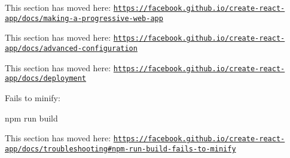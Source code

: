 This section has moved here\+: \href{https://facebook.github.io/create-react-app/docs/making-a-progressive-web-app}{\tt https\+://facebook.\+github.\+io/create-\/react-\/app/docs/making-\/a-\/progressive-\/web-\/app}

This section has moved here\+: \href{https://facebook.github.io/create-react-app/docs/advanced-configuration}{\tt https\+://facebook.\+github.\+io/create-\/react-\/app/docs/advanced-\/configuration}

This section has moved here\+: \href{https://facebook.github.io/create-react-app/docs/deployment}{\tt https\+://facebook.\+github.\+io/create-\/react-\/app/docs/deployment}

Fails to minify\+: 
\begin{DoxyCode}
npm run build
\end{DoxyCode}


This section has moved here\+: \href{https://facebook.github.io/create-react-app/docs/troubleshooting#npm-run-build-fails-to-minify}{\tt https\+://facebook.\+github.\+io/create-\/react-\/app/docs/troubleshooting\#npm-\/run-\/build-\/fails-\/to-\/minify} 